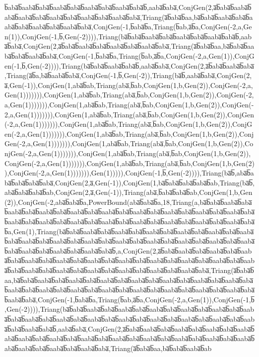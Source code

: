 b̅aba̅b̅aaba̅b̅aba̅b̅aaba̅b̅aba̅b̅aaba̅b̅aba̅b̅aaba̅b̅aba̅b̅,aaba̅b̅aba̅,ConjGen(2,a̅b̅aba̅b̅aaba̅b̅aba̅b̅aaba̅b̅aba̅b̅aaba̅b̅aba̅b̅aaba̅b̅aba̅b̅aaba̅b̅aba̅,Triang(a̅b̅aba̅b̅aa,ba̅b̅aba̅b̅aaba̅b̅aba̅b̅aaba̅b̅aba̅b̅aaba̅b̅aba̅b̅aaba̅b̅aba̅,ConjGen(-1,b̅aba̅b̅a,Triang(b̅ab,a̅b̅a,ConjGen(-2,a,Gen(1)),ConjGen(-1,b̅,Gen(-2)))),Triang(ba̅b̅aba̅b̅aaba̅b̅aba̅b̅aaba̅b̅aba̅b̅aaba̅b̅aba̅b̅,aaba̅b̅aba̅,ConjGen(2,a̅b̅aba̅b̅aaba̅b̅aba̅b̅aaba̅b̅aba̅b̅aaba̅b̅aba̅,Triang(a̅b̅aba̅b̅aa,ba̅b̅aba̅b̅aaba̅b̅aba̅b̅aaba̅b̅aba̅,ConjGen(-1,b̅aba̅b̅a,Triang(b̅ab,a̅b̅a,ConjGen(-2,a,Gen(1)),ConjGen(-1,b̅,Gen(-2)))),Triang(ba̅b̅aba̅b̅aaba̅b̅aba̅b̅,aaba̅b̅aba̅,ConjGen(2,a̅b̅aba̅b̅aaba̅b̅aba̅,Triang(a̅b̅a,ba̅b̅aaba̅b̅aba̅,ConjGen(-1,b̅,Gen(-2)),Triang(ba̅b̅,aaba̅b̅aba̅,ConjGen(2,a̅,Gen(-1)),ConjGen(1,aba̅b̅ab,Triang(aba̅,b̅ab,ConjGen(1,b,Gen(2)),ConjGen(-2,a,Gen(1))))))),ConjGen(1,aba̅b̅ab,Triang(aba̅,b̅ab,ConjGen(1,b,Gen(2)),ConjGen(-2,a,Gen(1))))))),ConjGen(1,aba̅b̅ab,Triang(aba̅,b̅ab,ConjGen(1,b,Gen(2)),ConjGen(-2,a,Gen(1))))))),ConjGen(1,aba̅b̅ab,Triang(aba̅,b̅ab,ConjGen(1,b,Gen(2)),ConjGen(-2,a,Gen(1))))))),ConjGen(1,aba̅b̅ab,Triang(aba̅,b̅ab,ConjGen(1,b,Gen(2)),ConjGen(-2,a,Gen(1))))))),ConjGen(1,aba̅b̅ab,Triang(aba̅,b̅ab,ConjGen(1,b,Gen(2)),ConjGen(-2,a,Gen(1))))))),ConjGen(1,aba̅b̅ab,Triang(aba̅,b̅ab,ConjGen(1,b,Gen(2)),ConjGen(-2,a,Gen(1))))))),ConjGen(1,aba̅b̅ab,Triang(aba̅,b̅ab,ConjGen(1,b,Gen(2)),ConjGen(-2,a,Gen(1))))))),ConjGen(1,aba̅b̅ab,Triang(aba̅,b̅ab,ConjGen(1,b,Gen(2)),ConjGen(-2,a,Gen(1))))))),Gen(1))))),ConjGen(-1,b̅,Gen(-2)))),Triang(ba̅b̅,aba̅b̅aba̅b̅aba̅b̅aba̅b̅aba̅,ConjGen(2,a̅,Gen(-1)),ConjGen(1,ba̅b̅aba̅b̅aba̅b̅aba̅b̅ab,Triang(ba̅b̅,aba̅b̅aba̅b̅aba̅b̅ab,ConjGen(2,a̅,Gen(-1)),Triang(aba̅,b̅aba̅b̅aba̅b̅ab,ConjGen(1,b,Gen(2)),ConjGen(-2,aba̅b̅aba̅b̅a,PowerBound(aba̅b̅aba̅b̅a,18,Triang(a,ba̅b̅aba̅b̅aaba̅b̅aba̅b̅aaba̅b̅aba̅b̅aaba̅b̅aba̅b̅aaba̅b̅aba̅b̅aaba̅b̅aba̅b̅aaba̅b̅aba̅b̅aaba̅b̅aba̅b̅aaba̅b̅aba̅b̅aaba̅b̅aba̅b̅aaba̅b̅aba̅b̅aaba̅b̅aba̅b̅aaba̅b̅aba̅b̅aaba̅b̅aba̅b̅aaba̅b̅aba̅b̅aaba̅b̅aba̅b̅aaba̅b̅aba̅b̅aaba̅b̅aba̅b̅a,Gen(1),Triang(ba̅b̅aba̅b̅aaba̅b̅aba̅b̅aaba̅b̅aba̅b̅aaba̅b̅aba̅b̅aaba̅b̅aba̅b̅aaba̅b̅aba̅b̅aaba̅b̅aba̅b̅aaba̅b̅aba̅b̅aaba̅b̅aba̅b̅aaba̅b̅aba̅b̅aaba̅b̅aba̅b̅aaba̅b̅aba̅b̅aaba̅b̅aba̅b̅aaba̅b̅aba̅b̅aaba̅b̅aba̅b̅aaba̅b̅aba̅b̅aaba̅b̅aba̅b̅aaba̅b̅aba̅b̅,a,ConjGen(2,a̅b̅aba̅b̅aaba̅b̅aba̅b̅aaba̅b̅aba̅b̅aaba̅b̅aba̅b̅aaba̅b̅aba̅b̅aaba̅b̅aba̅b̅aaba̅b̅aba̅b̅aaba̅b̅aba̅b̅aaba̅b̅aba̅b̅aaba̅b̅aba̅b̅aaba̅b̅aba̅b̅aaba̅b̅aba̅b̅aaba̅b̅aba̅b̅aaba̅b̅aba̅b̅aaba̅b̅aba̅b̅aaba̅b̅aba̅b̅aaba̅b̅aba̅b̅aaba̅b̅aba̅,Triang(a̅b̅aba̅b̅aa,ba̅b̅aba̅b̅aaba̅b̅aba̅b̅aaba̅b̅aba̅b̅aaba̅b̅aba̅b̅aaba̅b̅aba̅b̅aaba̅b̅aba̅b̅aaba̅b̅aba̅b̅aaba̅b̅aba̅b̅aaba̅b̅aba̅b̅aaba̅b̅aba̅b̅aaba̅b̅aba̅b̅aaba̅b̅aba̅b̅aaba̅b̅aba̅b̅aaba̅b̅aba̅b̅aaba̅b̅aba̅b̅aaba̅b̅aba̅b̅aaba̅b̅aba̅,ConjGen(-1,b̅aba̅b̅a,Triang(b̅ab,a̅b̅a,ConjGen(-2,a,Gen(1)),ConjGen(-1,b̅,Gen(-2)))),Triang(ba̅b̅aba̅b̅aaba̅b̅aba̅b̅aaba̅b̅aba̅b̅aaba̅b̅aba̅b̅aaba̅b̅aba̅b̅aaba̅b̅aba̅b̅aaba̅b̅aba̅b̅aaba̅b̅aba̅b̅aaba̅b̅aba̅b̅aaba̅b̅aba̅b̅aaba̅b̅aba̅b̅aaba̅b̅aba̅b̅aaba̅b̅aba̅b̅aaba̅b̅aba̅b̅aaba̅b̅aba̅b̅aaba̅b̅aba̅b̅,aaba̅b̅aba̅,ConjGen(2,a̅b̅aba̅b̅aaba̅b̅aba̅b̅aaba̅b̅aba̅b̅aaba̅b̅aba̅b̅aaba̅b̅aba̅b̅aaba̅b̅aba̅b̅aaba̅b̅aba̅b̅aaba̅b̅aba̅b̅aaba̅b̅aba̅b̅aaba̅b̅aba̅b̅aaba̅b̅aba̅b̅aaba̅b̅aba̅b̅aaba̅b̅aba̅b̅aaba̅b̅aba̅b̅aaba̅b̅aba̅b̅aaba̅b̅aba̅,Triang(a̅b̅aba̅b̅aa,ba̅b̅aba̅b̅aaba̅b̅ab